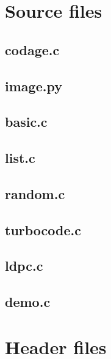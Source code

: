 \documentclass{article}
\author{Tom Hubrecht}
\begin{document}
\tableofcontents
\newpage


\section{Source files}


\subsection{codage.c}

\newpage

\subsection{image.py}

\newpage

\subsection{basic.c}

\newpage

\subsection{list.c}

\newpage

\subsection{random.c}

\newpage

\subsection{turbocode.c}

\newpage

\subsection{ldpc.c}

\newpage

\subsection{demo.c}

\newpage


\section{Header files}
\end{document}
